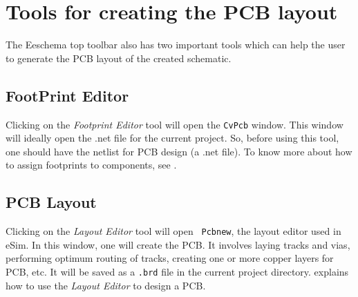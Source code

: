 \section {Tools for creating the PCB layout}
The Eeschema top toolbar also has two important tools which can help the user to generate the PCB layout of the created schematic.

\subsection {FootPrint Editor}
Clicking on the \textit{Footprint Editor} tool will open the {\tt CvPcb} 
 window. This window will ideally open the .net file for the 
current project. So, before using this tool, one should have the netlist 
for PCB design (a .net file). To know more about how to assign footprints 
to components, see .

\subsection {PCB Layout}
Clicking on the \textit{Layout Editor} tool will open {\tt
Pcbnew}, the layout editor used in eSim. In this
window, one will create the PCB. It involves laying tracks and vias,
performing optimum routing of tracks, creating one or more copper
layers for PCB, etc. It will be saved as a {\tt .brd} file in the 
current project directory.  explains how to use the 
\textit{Layout Editor} to design a PCB. 


%
